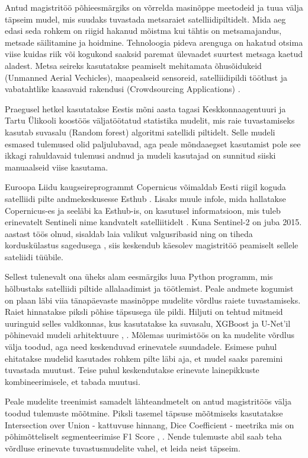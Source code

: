 Antud magistritöö põhieesmärgiks on võrrelda masinõppe meetodeid ja tuua välja täpseim mudel, mis suudaks tuvastada metsaraiet satelliidipiltidelt. Mida aeg edasi seda rohkem on riigid hakanud mõistma kui tähtis on metsamajandus, metsade säilitamine ja hoidmine. Tehnoloogia pideva arenguga on hakatud otsima viise kuidas riik või kogukond saaksid paremat ülevaadet suurtest metsaga kaetud aladest. Metsa seireks kasutatakse peamiselt mehitamata õhusõidukeid (Unmanned Aerial Vechicles), maapealseid sensoreid, satelliidipildi töötlust ja vabatahtlike kaasavaid rakendusi (Crowdsourcing Applications) \cite{cheungPerimeterDefense42015}.

Praegusel hetkel kasutatakse Eestis mõni aasta tagasi Keskkonnaagentuuri ja Tartu Ülikooli koostöös väljatöötatud statistika mudelit, mis raie tuvastamiseks kasutab suvasalu (Random forest) algoritmi \cite{TartuUlikooliTeadlased2020} satellidi piltidelt. Selle mudeli esmased tulemused olid paljulubavad, aga peale mõndaaegset kasutamist pole see ikkagi rahuldavaid tulemusi andnud ja mudeli kasutajad on sunnitud siiski manuaalseid viise kasutama.

Euroopa Liidu kaugseireprogrammt Copernicus võimaldab Eesti riigil koguda satelliidi pilte andmekeskusesse Esthub \cite{maa-ametRiiklikSatelliidiandmeteKeskus}. Lisaks muule infole, mida hallatakse Copernicus-es ja seeläbi ka Esthub-is, on kasutusel informatsioon, mis tuleb erinevatelt Sentineli nime kandvatelt satelliitidelt \cite{InfrastructureOverviewCopernicus}. Kuna Sentinel-2 on juba 2015. aastast töös olnud, sisaldab laia valikut valgusribasid ning on tiheda korduskülastus sagedusega \cite{Sentinel2OverviewScienceDirect}, siis keskendub käesolev magistritöö peamiselt sellele sateliidi tüübile.

Sellest tulenevalt ona üheks alam eesmärgiks luua Python programm, mis hõlbustaks satelliidi piltide allalaadimist ja töötlemist. Peale andmete kogumist on plaan läbi viia tänapäevaste masinõppe mudelite võrdlus raiete tuvastamiseks. Raiet hinnatakse piksli põhise täpsusega üle pildi. Hiljuti on tehtud mitmeid uuringuid selles valdkonnas, kus kasutatakse ka suvasalu, XGBoost ja U-Net’il põhinevaid mudeli arhitektuure \cite{isaienkovDeepLearningRegular2021}, \cite{podoprigorovaRecognitionForestDamage2024}. Mõlemas uurimistöös on ka mudelite võrdlus välja toodud, aga need keskenduvad erinevatele suundadele. Esimese puhul ehitatakse mudelid kasutades rohkem pilte läbi aja, et mudel saaks paremini tuvastada muutust. Teise puhul keskendutakse erinevate lainepikkuste kombineerimisele, et tabada muutusi. 

Peale mudelite treenimist samadelt lähteandmetelt on antud magistritöös välja toodud tulemuste mõõtmine. Piksli tasemel täpsuse mõõtmiseks kasutatakse Intersection over Union - kattuvuse hinnang, Dice Coefficient - meetrika mis on põhimõtteliselt segmenteerimise F1 Score \cite{IntersectionUnionIoU}, \cite{UnderstandingDICECOEFFICIENT}. Nende tulemuste abil saab teha võrdluse erinevate tuvastusmudelite vahel, et leida neist täpseim.
